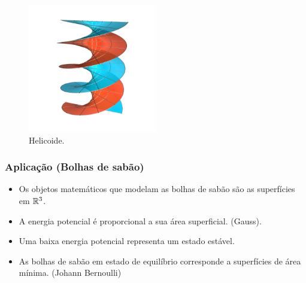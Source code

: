 \documentclass[10pt,a4paper]{beamer}
\theoremstyle{definition}
\begin{document}
\begin{frame}
	
	\begin{figure}
		\centering
		\includegraphics[width=0.5\textwidth]{images/helicoid}
		\caption{Helicoide.}
	\end{figure}
\end{frame}

\begin{frame}
	\frametitle{Aplicação (Bolhas de sabão)}
	
	\begin{itemize}
		\item Os objetos matemáticos que modelam as bolhas de sabão são as superfícies em $\mathbb R^3$.
		\pause
		\item A energia potencial é proporcional a sua área superficial. (Gauss).
		\pause
		\item Uma baixa energia potencial representa um estado estável.
		\pause 
		\item As bolhas de sabão em estado de equilíbrio corresponde a superfícies de área mínima. (Johann Bernoulli)
	\end{itemize}
	
	
\end{frame}
\end{document}
